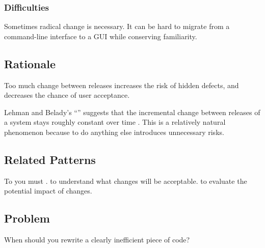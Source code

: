 \documentclass[a4paper,10pt,twoside]{book}
\begin{document}
\subsubsection*{Difficulties}

\begin{bulletlist}
\item Sometimes radical change is necessary. It can be hard to migrate from a command-line interface to a GUI while conserving familiarity.
\end{bulletlist}

\subsection*{Rationale}

Too much change between releases increases the risk of hidden defects, and decreases the chance of user acceptance. 

Lehman and Belady's ``'' suggests that the incremental change between releases of a system stays roughly constant over time \cite{Lehm85a}. This is a relatively natural phenomenon because to do anything else introduces unnecessary risks.

\subsection*{Related Patterns}

To  you must .  to understand what changes will be acceptable.  to evaluate the potential impact of changes.




\subsection*{Problem}

When should you rewrite a clearly inefficient piece of code?
\end{document}
